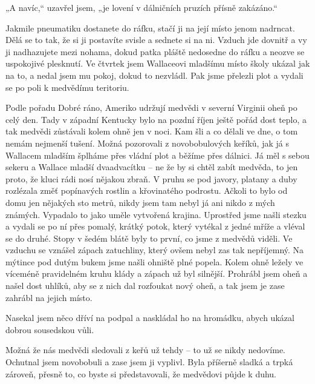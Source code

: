 „A navíc,“ uzavřel jsem, „je lovení v dálničních pruzích přísně zakázáno.“

\bigskip

Jakmile pneumatiku dostanete do ráfku, stačí ji na její místo jenom nadrncat. Dělá se to tak, že si ji postavíte svisle a sednete si na ni. Vzduch jde dovnitř a vy ji nadhazujete mezi nohama, dokud patka pláště nedosedne do ráfku a neozve se uspokojivé plesknutí. Ve čtvrtek jsem Wallaceovi mladšímu místo školy ukázal jak na to, a nedal jsem mu pokoj, dokud to nezvládl. Pak jsme přelezli plot a vydali se po poli k medvědímu teritoriu.

Podle pořadu  Dobré ráno, Ameriko  udržují medvědi v severní Virginii oheň po celý den. Tady v západní Kentucky bylo na pozdní říjen ještě pořád dost teplo, a tak medvědi zůstávali kolem ohně jen v noci. Kam šli a co dělali ve dne, o tom nemám nejmenší tušení. Možná pozorovali z novobobulových keříků, jak já s Wallacem mladším šplháme přes vládní plot a běžíme přes dálnici. Já měl s sebou sekeru a Wallace mladší dvaadvacítku – ne že by si chtěl zabít medvěda, to jen proto, že kluci rádi nosí nějakou zbraň. V pruhu se pod javory, platany a duby rozlézala změť popínavých rostlin a křovinatého podrostu. Ačkoli to bylo od domu jen nějakých sto metrů, nikdy jsem tam nebyl já ani nikdo z mých známých. Vypadalo to jako uměle vytvořená krajina. Uprostřed jsme našli stezku a vydali se po ní přes pomalý, krátký potok, který vytékal z jedné mříže a vléval se do druhé. Stopy v šedém blátě byly to první, co jsme z medvědů viděli. Ve vzduchu se vznášel zápach zatuchliny, který ovšem nebyl zas tak nepříjemný. Na mýtince pod dutým bukem jsme našli ohniště plné popela. Kolem ohně ležely ve víceméně pravidelném kruhu klády a zápach už byl silnější. Prohrábl jsem oheň a našel dost uhlíků, aby se z nich dal rozfoukat nový oheň, a tak jsem je zase zahrábl na jejich místo.

Nasekal jsem něco dříví na podpal a naskládal ho na hromádku, abych ukázal dobrou sousedskou vůli.

Možná že nás medvědi sledovali z keřů už tehdy – to už se nikdy nedovíme. Ochutnal jsem novobobuli a zase jsem ji vyplivl. Byla příšerně sladká a trpká zároveň, přesně to, co byste si představovali, že medvědovi půjde k duhu.

\bigskip

